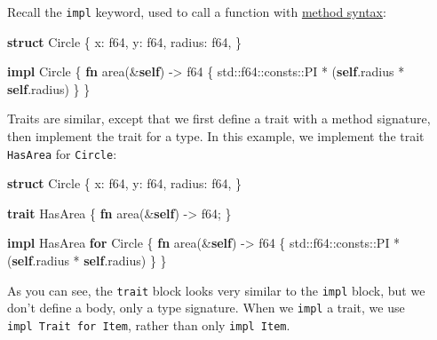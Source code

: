 \documentclass[a4paper,]{book}
\newenvironment{Shaded}{\begin{snugshade}}{\end{snugshade}}
\newcommand{\KeywordTok}[1]{\textcolor[rgb]{0.13,0.29,0.53}{\textbf{{#1}}}}
\newcommand{\DataTypeTok}[1]{\textcolor[rgb]{0.13,0.29,0.53}{{#1}}}
\newcommand{\NormalTok}[1]{{#1}}
\begin{document}
Recall the \texttt{impl} keyword, used to call a function with
\protect\hyperlink{sec--method-syntax}{method syntax}:

\begin{Shaded}
\begin{Highlighting}[]
\KeywordTok{struct} \NormalTok{Circle \{}
    \NormalTok{x: }\DataTypeTok{f64}\NormalTok{,}
    \NormalTok{y: }\DataTypeTok{f64}\NormalTok{,}
    \NormalTok{radius: }\DataTypeTok{f64}\NormalTok{,}
\NormalTok{\}}

\KeywordTok{impl} \NormalTok{Circle \{}
    \KeywordTok{fn} \NormalTok{area(&}\KeywordTok{self}\NormalTok{) -> }\DataTypeTok{f64} \NormalTok{\{}
        \NormalTok{std::}\DataTypeTok{f64}\NormalTok{::consts::PI * (}\KeywordTok{self}\NormalTok{.radius * }\KeywordTok{self}\NormalTok{.radius)}
    \NormalTok{\}}
\NormalTok{\}}
\end{Highlighting}
\end{Shaded}

Traits are similar, except that we first define a trait with a method
signature, then implement the trait for a type. In this example, we
implement the trait \texttt{HasArea} for \texttt{Circle}:

\begin{Shaded}
\begin{Highlighting}[]
\KeywordTok{struct} \NormalTok{Circle \{}
    \NormalTok{x: }\DataTypeTok{f64}\NormalTok{,}
    \NormalTok{y: }\DataTypeTok{f64}\NormalTok{,}
    \NormalTok{radius: }\DataTypeTok{f64}\NormalTok{,}
\NormalTok{\}}

\KeywordTok{trait} \NormalTok{HasArea \{}
    \KeywordTok{fn} \NormalTok{area(&}\KeywordTok{self}\NormalTok{) -> }\DataTypeTok{f64}\NormalTok{;}
\NormalTok{\}}

\KeywordTok{impl} \NormalTok{HasArea }\KeywordTok{for} \NormalTok{Circle \{}
    \KeywordTok{fn} \NormalTok{area(&}\KeywordTok{self}\NormalTok{) -> }\DataTypeTok{f64} \NormalTok{\{}
        \NormalTok{std::}\DataTypeTok{f64}\NormalTok{::consts::PI * (}\KeywordTok{self}\NormalTok{.radius * }\KeywordTok{self}\NormalTok{.radius)}
    \NormalTok{\}}
\NormalTok{\}}
\end{Highlighting}
\end{Shaded}

As you can see, the \texttt{trait} block looks very similar to the
\texttt{impl} block, but we don't define a body, only a type signature.
When we \texttt{impl} a trait, we use \texttt{impl\ Trait\ for\ Item},
rather than only \texttt{impl\ Item}.
\end{document}
